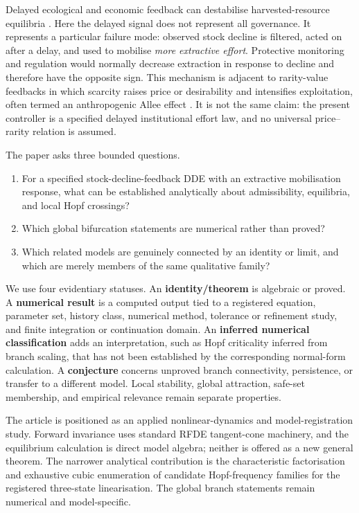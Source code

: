 \documentclass[11pt]{article}
\begin{document}
Delayed ecological and economic feedback can destabilise harvested-resource equilibria \cite{hassard1981,gao2022,khiyar2026}. Here the delayed signal does not represent all governance. It represents a particular failure mode: observed stock decline is filtered, acted on after a delay, and used to mobilise \emph{more extractive effort}. Protective monitoring and regulation would normally decrease extraction in response to decline and therefore have the opposite sign. This mechanism is adjacent to rarity-value feedbacks in which scarcity raises price or desirability and intensifies exploitation, often termed an anthropogenic Allee effect \cite{courchamp2006}. It is not the same claim: the present controller is a specified delayed institutional effort law, and no universal price--rarity relation is assumed.

The paper asks three bounded questions.

\begin{enumerate}
    \item For a specified stock-decline-feedback DDE with an extractive mobilisation response, what can be established analytically about admissibility, equilibria, and local Hopf crossings?
    \item Which global bifurcation statements are numerical rather than proved?
    \item Which related models are genuinely connected by an identity or limit, and which are merely members of the same qualitative family?
\end{enumerate}

We use four evidentiary statuses. An \textbf{identity/theorem} is algebraic or proved. A \textbf{numerical result} is a computed output tied to a registered equation, parameter set, history class, numerical method, tolerance or refinement study, and finite integration or continuation domain. An \textbf{inferred numerical classification} adds an interpretation, such as Hopf criticality inferred from branch scaling, that has not been established by the corresponding normal-form calculation. A \textbf{conjecture} concerns unproved branch connectivity, persistence, or transfer to a different model. Local stability, global attraction, safe-set membership, and empirical relevance remain separate properties.

The article is positioned as an applied nonlinear-dynamics and model-registration study. Forward invariance uses standard RFDE tangent-cone machinery, and the equilibrium calculation is direct model algebra; neither is offered as a new general theorem. The narrower analytical contribution is the characteristic factorisation and exhaustive cubic enumeration of candidate Hopf-frequency families for the registered three-state linearisation. The global branch statements remain numerical and model-specific.
\end{document}
